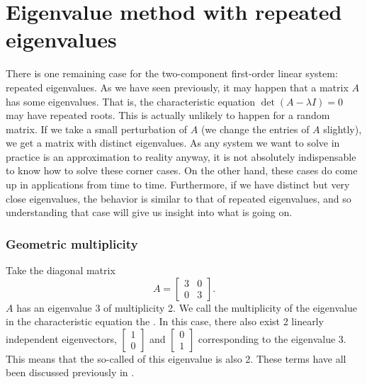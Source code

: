 \section{Eigenvalue method with repeated eigenvalues}
\label{eigenmethod-repeat:section}



There is one remaining case for the two-component first-order linear system: repeated eigenvalues. As we have seen previously, it may happen that a matrix $A$ has some  eigenvalues.
That is, the characteristic equation $\det(A-\lambda I) = 0$ may have
repeated roots.  This is actually unlikely to happen
for a random matrix.  If we take a small perturbation of $A$ (we change the
entries of $A$ slightly), we get a matrix with distinct eigenvalues.  As
any system we want to solve in practice is an approximation to reality
anyway, it is not absolutely indispensable to know how to solve these
corner cases.  
On the other hand, these cases do come up in applications from time to time.
Furthermore, if we have distinct but very close eigenvalues, the behavior is
similar to that of repeated eigenvalues, and so understanding that case
will give us insight into what is going on.

\subsubsection{Geometric multiplicity}

Take the diagonal matrix
\begin{equation*}
A =
\begin{bmatrix}
3 & 0 \\ 0 & 3
\end{bmatrix} .
\end{equation*}
$A$ has an eigenvalue 3 of multiplicity 2.  We call the
multiplicity of the eigenvalue
in the characteristic equation the
\emph{}.  In this case, there also exist 2
linearly
independent eigenvectors,
$\left[ \begin{smallmatrix} 1 \\ 0 \end{smallmatrix} \right]$
and
$\left[ \begin{smallmatrix} 0 \\ 1 \end{smallmatrix} \right]$ corresponding
to the eigenvalue 3.  This means
that the so-called \emph{}
of this eigenvalue is also 2. These terms have all been discussed previously in .

